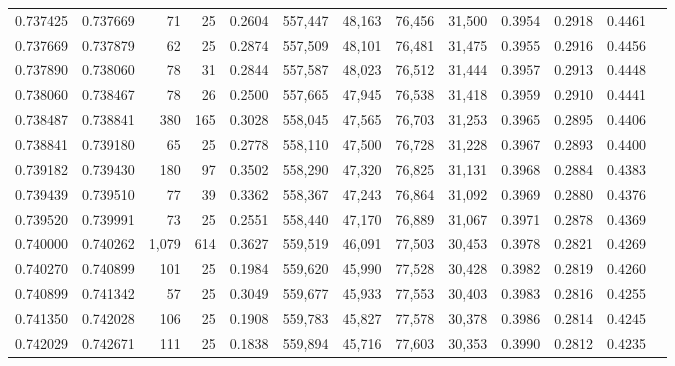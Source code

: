 \begin{tabular}{rrrrrrrrrrrrr}
0.737425 & 0.737669 &    71 &  25 &                                     0.2604 & 557,447 &  48,163 &  76,456 &  31,500 & 0.3954 & 0.2918 & 0.4461 \\
0.737669 & 0.737879 &    62 &  25 &                                     0.2874 & 557,509 &  48,101 &  76,481 &  31,475 & 0.3955 & 0.2916 & 0.4456 \\
0.737890 & 0.738060 &    78 &  31 &                                     0.2844 & 557,587 &  48,023 &  76,512 &  31,444 & 0.3957 & 0.2913 & 0.4448 \\
0.738060 & 0.738467 &    78 &  26 &                                     0.2500 & 557,665 &  47,945 &  76,538 &  31,418 & 0.3959 & 0.2910 & 0.4441 \\
0.738487 & 0.738841 &   380 & 165 &                                     0.3028 & 558,045 &  47,565 &  76,703 &  31,253 & 0.3965 & 0.2895 & 0.4406 \\
0.738841 & 0.739180 &    65 &  25 &                                     0.2778 & 558,110 &  47,500 &  76,728 &  31,228 & 0.3967 & 0.2893 & 0.4400 \\
0.739182 & 0.739430 &   180 &  97 &                                     0.3502 & 558,290 &  47,320 &  76,825 &  31,131 & 0.3968 & 0.2884 & 0.4383 \\
0.739439 & 0.739510 &    77 &  39 &                                     0.3362 & 558,367 &  47,243 &  76,864 &  31,092 & 0.3969 & 0.2880 & 0.4376 \\
0.739520 & 0.739991 &    73 &  25 &                                     0.2551 & 558,440 &  47,170 &  76,889 &  31,067 & 0.3971 & 0.2878 & 0.4369 \\
0.740000 & 0.740262 & 1,079 & 614 &                                     0.3627 & 559,519 &  46,091 &  77,503 &  30,453 & 0.3978 & 0.2821 & 0.4269 \\
0.740270 & 0.740899 &   101 &  25 &                                     0.1984 & 559,620 &  45,990 &  77,528 &  30,428 & 0.3982 & 0.2819 & 0.4260 \\
0.740899 & 0.741342 &    57 &  25 &                                     0.3049 & 559,677 &  45,933 &  77,553 &  30,403 & 0.3983 & 0.2816 & 0.4255 \\
0.741350 & 0.742028 &   106 &  25 &                                     0.1908 & 559,783 &  45,827 &  77,578 &  30,378 & 0.3986 & 0.2814 & 0.4245 \\
0.742029 & 0.742671 &   111 &  25 &                                     0.1838 & 559,894 &  45,716 &  77,603 &  30,353 & 0.3990 & 0.2812 & 0.4235 \\

\end{tabular}
